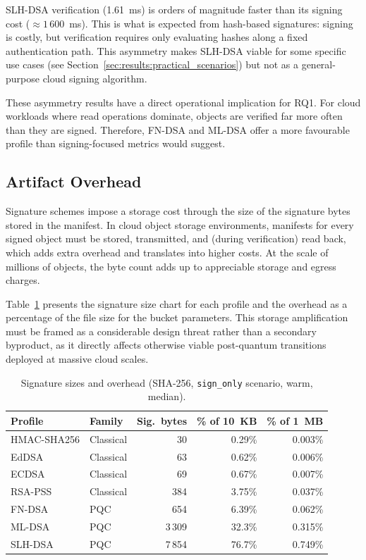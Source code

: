 \documentclass[12pt,a4paper]{article}
\begin{document}
SLH-DSA verification (1.61~ms) is orders of magnitude faster than its signing cost ($\approx 1\,600$~ms). This is what is expected from hash-based signatures: signing is costly, but verification requires only evaluating hashes along a fixed authentication path. This asymmetry makes SLH-DSA viable for some specific use cases (see Section~\ref{sec:results:practical_scenarios}) but not as a general-purpose cloud signing algorithm.

These asymmetry results have a direct operational implication for RQ1. For cloud workloads where read operations dominate, objects are verified far more often than they are signed. Therefore, FN-DSA and ML-DSA offer a more favourable profile than signing-focused metrics would suggest.


\subsection{Artifact Overhead}
\label{sec:results: artefact}

Signature schemes impose a storage cost through the size of the signature bytes stored in the manifest. In cloud object storage environments, manifests for every signed object must be stored, transmitted, and (during verification) read back, which adds extra overhead and translates into higher costs. At the scale of millions of objects, the byte count adds up to appreciable storage and egress charges.

Table~\ref{tab:signature_sizes} presents the signature size chart for each profile and the overhead as a percentage of the file size for the bucket parameters. This storage amplification must be framed as a considerable design threat rather than a secondary byproduct, as it directly affects otherwise viable post-quantum transitions deployed at massive cloud scales.

\begin{table}[H]
\centering
\caption{Signature sizes and overhead (SHA-256, \texttt{sign\_only} scenario,
         warm, median).}
\label{tab:signature_sizes}
\begin{tabular}{l l r rr}
\toprule
Profile & Family & Sig.\ bytes & \% of 10~KB & \% of 1~MB \\
\midrule
HMAC-SHA256 & Classical &     30 & 0.29\% & 0.003\% \\
EdDSA       & Classical &     63 & 0.62\% & 0.006\% \\
ECDSA       & Classical &     69 & 0.67\% & 0.007\% \\
RSA-PSS     & Classical &    384 & 3.75\% & 0.037\% \\
FN-DSA      & PQC       &    654 & 6.39\% & 0.062\% \\
ML-DSA      & PQC       &  3\,309 & 32.3\% & 0.315\% \\
SLH-DSA     & PQC       &  7\,854 & 76.7\% & 0.749\% \\
\bottomrule
\end{tabular}
\end{table}
\end{document}
